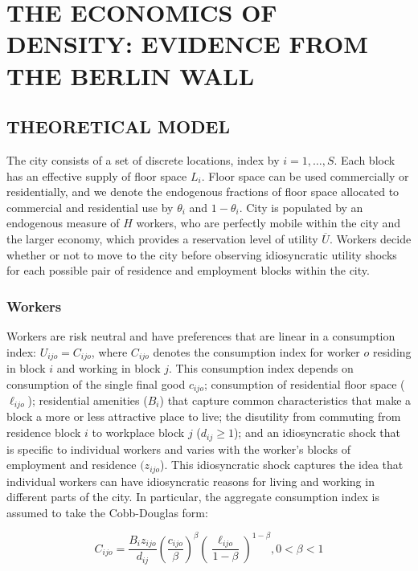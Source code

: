 \chapter{THE ECONOMICS OF DENSITY: EVIDENCE FROM THE BERLIN WALL}

\section{THEORETICAL MODEL}

The city consists of a set of discrete locations, index by $i = 1, \ldots, S$. Each block has an effective supply of floor space $L_i$. Floor space can be used commercially or residentially, and we denote the endogenous fractions of floor space allocated to commercial and residential use by $\theta_i$ and $1 - \theta_i$. City is populated by an endogenous measure of $H$ workers, who are perfectly mobile within the city and the larger economy, which provides a reservation level of utility $\overline{U}$. Workers decide whether or not to move to the city before observing idiosyncratic utility shocks for each possible pair of residence and employment blocks within the city.

\subsection{Workers}

Workers are risk neutral and have preferences that are linear in a consumption index: $U_{ijo} = C_{ijo}$, where $C_{ijo}$ denotes the consumption index for worker $o$ residing in block $i$ and working in block $j$. This consumption index depends on consumption of the single final good $c_{ijo}$; consumption of residential floor space ($\ell_{ijo}$); residential amenities ($B_i$) that capture common characteristics that make a block a more or less attractive place to live; the disutility from commuting from residence block $i$ to workplace block $j$ ($d_{ij} \geq 1$); and an idiosyncratic shock that is specific to individual workers and varies with the worker's blocks of employment and residence $(z_{ijo}$). This idiosyncratic shock captures the idea that individual workers can have idiosyncratic reasons for living and working in different parts of the city. In particular, the aggregate consumption index is assumed to take the Cobb-Douglas form:

\begin{equation}
    C_{ijo} = \frac{B_i z_{ijo}}{d_{ij}} (\frac{c_{ijo}}{\beta})^{\beta} (\frac{\ell_{ijo}}{1 - \beta})^{1 - \beta}, 0 < \beta < 1
\end{equation}

